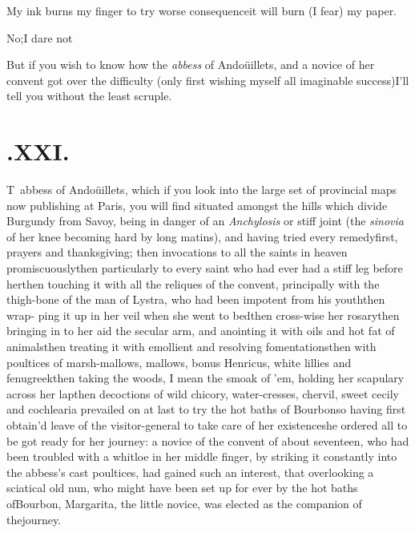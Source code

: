 \documentclass{article}
\begin{document}
\tsh My ink burns my finger to try\break
{}
worse consequence\tsh it will burn (I fear) my paper.

\tsh No;\tsh I dare not\tsh

But if you wish to know how the \textit{ab\-bess} of
Andoüillets, and a novice of her convent got over the
difficulty (only first wishing myself all imaginable
success)\tsk I’ll tell you without the least scruple.

\vfill{}\eject
\section{.\enspace XXI.}

\lettrine{T}{\,} abbess of Andoüillets, which if you look into the large set of
provincial maps now publishing at Paris, you will find situated amongst the
hills which divide Burgundy from Savoy, being in danger of an
\textit{Anchylosis} or stiff joint (the \textit{sinovia} of her knee becoming hard
by long matins), and having tried every remedy\tsh first, prayers and thanksgiving;
then invocations to all the saints in heaven promiscuously\tsh then particularly to
every saint who had ever had a stiff leg before her\tsh then touching it with all
the reliques of the convent, principally with the thigh-bone of the man of
Lystra, who had been impotent from his youth\tsh then wrap- ping it up in
her veil when she went to bed\tsk then cross-wise her rosary\tsk then bringing in to her
aid the secular arm, and anointing it with oils and hot fat of animals\tsh then
treating it with emollient and resolving fomentations\tsh then with poultices of
marsh-mallows, mallows, bonus Henricus, white lillies and fenugreek\tsk then taking
the woods, I mean the smoak of ’em, holding her scapulary across her lap\tsh then
decoctions of wild chicory, water-cresses, chervil, sweet cecily and cochlearia\tsh
{} 
prevailed on at last to try the hot baths
of Bourbon\tsh so having first obtain’d leave of the visitor-general to
take care of her existence\tsk she ordered all to be got ready for her journey: a
novice of the convent of about seventeen, who had been troubled with a whitloe in
her middle finger, by striking it constantly into the abbess’s cast poultices, \etc
\tsh had gained such an interest, that overlooking a sciatical old nun, who might have
been set up for ever by the hot baths of\break Bourbon, Margarita, the little
novice, was elected as the companion of the\break journey.
\end{document}
